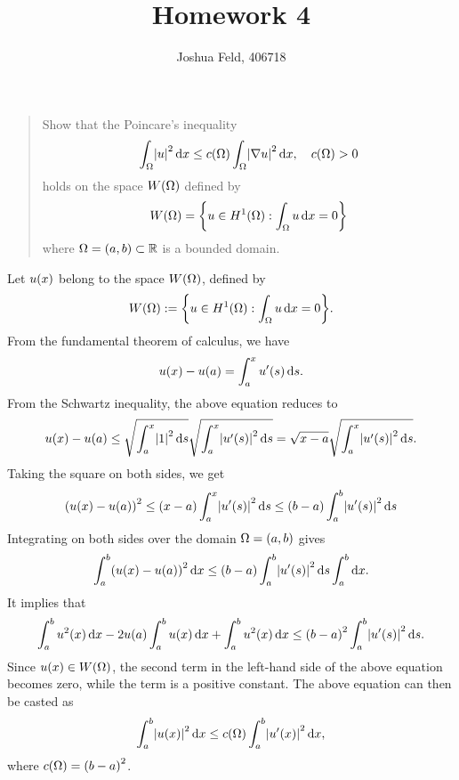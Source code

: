 \documentclass[english]{exercise}
\title{Homework 4}
\author{Joshua Feld, 406718}
\begin{document}
	\maketitle


	\section{}

	\begin{quote}
		Show that the Poincare's inequality
		\[
			\int_\Omega \absolute*{u}^2 \d x \le c\parentheses*{\Omega}\int_\Omega \absolute*{\nabla u}^2 \d x, \quad c\parentheses*{\Omega} > 0
		\]
		holds on the space \(W\parentheses*{\Omega}\) defined by
		\[
			W\parentheses*{\Omega} = \braces*{u \in H^1\parentheses*{\Omega} : \int_\Omega u\d x = 0}
		\]
		where \(\Omega = \parentheses*{a, b} \subset \R\) is a bounded domain.
	\end{quote}

	Let \(u\parentheses*{x}\) belong to the space \(W\parentheses*{\Omega}\), defined by
	\[
		W\parentheses*{\Omega} := \braces*{u \in H^1\parentheses*{\Omega} : \int_\Omega u\d x = 0}.
	\]
	From the fundamental theorem of calculus, we have
	\[
		u\parentheses*{x} - u\parentheses*{a} = \int_a^x u'\parentheses*{s}\d s.
	\]
	From the Schwartz inequality, the above equation reduces to
	\[
		u\parentheses*{x} - u\parentheses*{a} \le \sqrt{\int_a^x \absolute*{1}^2 \d s}\sqrt{\int_a^x \absolute*{u'\parentheses*{s}}^2 \d s} = \sqrt{x - a}\sqrt{\int_a^x \absolute*{u'\parentheses*{s}}^2 \d s}.
	\]
	Taking the square on both sides, we get
	\[
		\parentheses*{u\parentheses*{x} - u\parentheses*{a}}^2 \le \parentheses*{x - a}\int_a^x \absolute*{u'\parentheses*{s}}^2 \d s \le \parentheses*{b - a}\int_a^b \absolute*{u'\parentheses*{s}}^2 \d s
	\]
	Integrating on both sides over the domain \(\Omega = \parentheses*{a, b}\) gives
	\[
		\int_a^b \parentheses*{u\parentheses*{x} - u\parentheses*{a}}^2 \d x \le \parentheses*{b - a}\int_a^b \absolute*{u'\parentheses*{s}}^2 \d s\int_a^b \d x.
	\]
	It implies that
	\[
		\int_a^b u^2\parentheses*{x}\d x - 2u\parentheses*{a}\int_a^b u\parentheses*{x}\d x + \int_a^b u^2\parentheses*{x}\d x \le \parentheses*{b - a}^2 \int_a^b \absolute*{u'\parentheses*{s}}^2 \d s.
	\]
	Since \(u\parentheses*{x} \in W\parentheses*{\Omega}\), the second term in the left-hand side of the above equation becomes zero, while the term is a positive constant.
	The above equation can then be casted as
	\[
		\int_a^b \absolute*{u\parentheses*{x}}^2 \d x \le c\parentheses*{\Omega}\int_a^b \absolute*{u'\parentheses*{x}}^2 \d x,
	\]
	where \(c\parentheses*{\Omega} = \parentheses*{b - a}^2\).
\end{document}
